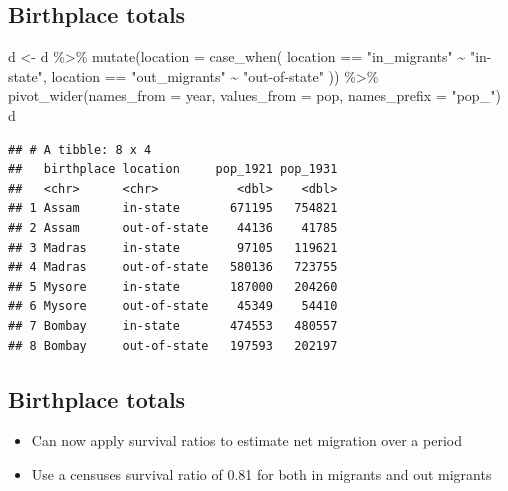 \documentclass[
]{book}
\newenvironment{Shaded}{\begin{snugshade}}{\end{snugshade}}
\newcommand{\AttributeTok}[1]{\textcolor[rgb]{0.77,0.63,0.00}{#1}}
\newcommand{\FunctionTok}[1]{\textcolor[rgb]{0.00,0.00,0.00}{#1}}
\newcommand{\NormalTok}[1]{#1}
\newcommand{\OtherTok}[1]{\textcolor[rgb]{0.56,0.35,0.01}{#1}}
\newcommand{\SpecialCharTok}[1]{\textcolor[rgb]{0.00,0.00,0.00}{#1}}
\newcommand{\StringTok}[1]{\textcolor[rgb]{0.31,0.60,0.02}{#1}}
\providecommand{\tightlist}{%
  \setlength{\itemsep}{0pt}\setlength{\parskip}{0pt}}
\begin{document}
\hypertarget{birthplace-totals-3}{%
\subsection{Birthplace totals}\label{birthplace-totals-3}}

\begin{Shaded}
\begin{Highlighting}[]
\NormalTok{d }\OtherTok{\textless{}{-}}\NormalTok{ d }\SpecialCharTok{\%\textgreater{}\%}
  \FunctionTok{mutate}\NormalTok{(}\AttributeTok{location =} \FunctionTok{case\_when}\NormalTok{(}
\NormalTok{    location }\SpecialCharTok{==} \StringTok{"in\_migrants"} \SpecialCharTok{\textasciitilde{}} \StringTok{"in{-}state"}\NormalTok{,}
\NormalTok{    location }\SpecialCharTok{==} \StringTok{"out\_migrants"} \SpecialCharTok{\textasciitilde{}} \StringTok{"out{-}of{-}state"}
\NormalTok{  )) }\SpecialCharTok{\%\textgreater{}\%}
  \FunctionTok{pivot\_wider}\NormalTok{(}\AttributeTok{names\_from =}\NormalTok{ year, }\AttributeTok{values\_from =}\NormalTok{ pop, }\AttributeTok{names\_prefix =} \StringTok{"pop\_"}\NormalTok{)}
\NormalTok{d}
\end{Highlighting}
\end{Shaded}

\begin{verbatim}
## # A tibble: 8 x 4
##   birthplace location     pop_1921 pop_1931
##   <chr>      <chr>           <dbl>    <dbl>
## 1 Assam      in-state       671195   754821
## 2 Assam      out-of-state    44136    41785
## 3 Madras     in-state        97105   119621
## 4 Madras     out-of-state   580136   723755
## 5 Mysore     in-state       187000   204260
## 6 Mysore     out-of-state    45349    54410
## 7 Bombay     in-state       474553   480557
## 8 Bombay     out-of-state   197593   202197
\end{verbatim}

\hypertarget{birthplace-totals-4}{%
\subsection{Birthplace totals}\label{birthplace-totals-4}}

\begin{itemize}
\tightlist
\item
  Can now apply survival ratios to estimate net migration over a period
\item
  Use a censuses survival ratio of 0.81 for both in migrants and out migrants
\end{itemize}
\end{document}
